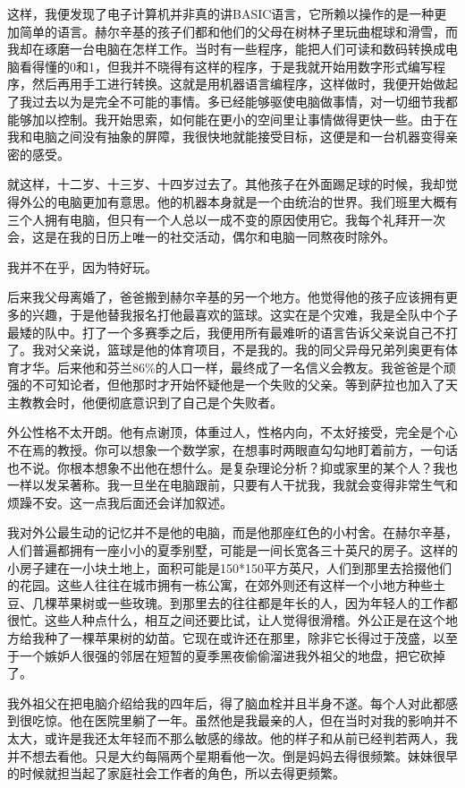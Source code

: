 这样，我便发现了电子计算机并非真的讲BASIC语言，它所赖以操作的是一种更加简单的语言。赫尔辛基的孩子们都和他们的父母在树林子里玩曲棍球和滑雪，而我却在琢磨一台电脑在怎样工作。当时有一些程序，能把人们可读和数码转换成电脑看得懂的0和1，但我并不晓得有这样的程序，于是我就开始用数字形式编写程序，然后再用手工进行转换。这就是用机器语言编程序，这样做时，我便开始做起了我过去以为是完全不可能的事情。多已经能够驱使电脑做事情，对一切细节我都能够加以控制。我开始思索，如何能在更小的空间里让事情做得更快一些。由于在我和电脑之间没有抽象的屏障，我很快地就能接受目标，这便是和一台机器变得亲密的感受。

就这样，十二岁、十三岁、十四岁过去了。其他孩子在外面踢足球的时候，我却觉得外公的电脑更加有意思。他的机器本身就是一个由统治的世界。我们班里大概有三个人拥有电脑，但只有一个人总以一成不变的原因使用它。我每个礼拜开一次会，这是在我的日历上唯一的社交活动，偶尔和电脑一同熬夜时除外。

我并不在乎，因为特好玩。

后来我父母离婚了，爸爸搬到赫尔辛基的另一个地方。他觉得他的孩子应该拥有更多的兴趣，于是他替我报名打他最喜欢的篮球。这实在是个灾难，我是全队中个子最矮的队中。打了一个多赛季之后，我便用所有最难听的语言告诉父亲说自己不打了。我对父亲说，篮球是他的体育项目，不是我的。我的同父异母兄弟列奥更有体育才华。后来他和芬兰86\%的人口一样，最终成了一名信义会教友。我爸爸是个顽强的不可知论者，但他那时才开始怀疑他是一个失败的父亲。等到萨拉也加入了天主教教会时，他便彻底意识到了自己是个失败者。

外公性格不太开朗。他有点谢顶，体重过人，性格内向，不太好接受，完全是个心不在焉的教授。你可以想象一个数学家，在想事时两眼直勾勾地盯着前方，一句话也不说。你根本想象不出他在想什么。是复杂理论分析？抑或家里的某个人？我也一样以发呆著称。我一旦坐在电脑跟前，只要有人干扰我，我就会变得非常生气和烦躁不安。这一点我后面还会详加叙述。

我对外公最生动的记忆并不是他的电脑，而是他那座红色的小村舍。在赫尔辛基，人们普遍都拥有一座小小的夏季别墅，可能是一间长宽各三十英尺的房子。这样的小房子建在一小块土地上，面积可能是150*150平方英尺，人们到那里去拾掇他们的花园。这些人往往在城市拥有一栋公寓，在郊外则还有这样一个小地方种些土豆、几棵苹果树或一些玫瑰。到那里去的往往都是年长的人，因为年轻人的工作都很忙。这些人种点什么，相互之间还要比试，让人觉得很滑稽。外公正是在这个地方给我种了一棵苹果树的幼苗。它现在或许还在那里，除非它长得过于茂盛，以至于一个嫉妒人很强的邻居在短暂的夏季黑夜偷偷溜进我外祖父的地盘，把它砍掉了。

我外祖父在把电脑介绍给我的四年后，得了脑血栓并且半身不遂。每个人对此都感到很吃惊。他在医院里躺了一年。虽然他是我最亲的人，但在当时对我的影响并不太大，或许是我还太年轻而不那么敏感的缘故。他的样子和从前已经判若两人，我并不想去看他。只是大约每隔两个星期看他一次。倒是妈妈去得很频繁。妹妹很早的时候就担当起了家庭社会工作者的角色，所以去得更频繁。

